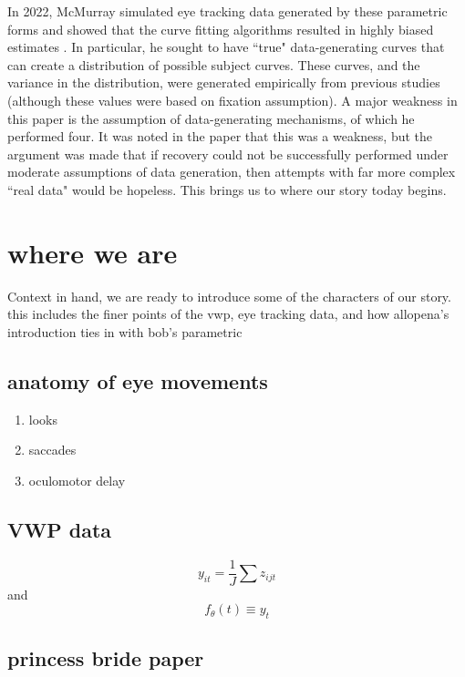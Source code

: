 \documentclass{article}
\begin{document}
In 2022, McMurray simulated eye tracking data generated by these parametric forms and showed that the curve fitting algorithms resulted in highly biased estimates \cite{mcmurray2022m}. In particular, he sought to have ``true" data-generating curves that can create a distribution of possible subject curves. These curves, and the variance in the distribution, were generated empirically from previous studies (although these values were based on fixation assumption). A major weakness in this paper is the assumption of data-generating mechanisms, of which he performed four. It was noted in the paper that this was a weakness, but the argument was made that if recovery could not be successfully performed under moderate assumptions of data generation, then attempts with far more complex ``real data" would be hopeless. This brings us to where our story today begins.

\section{where we are}

Context in hand, we are ready to introduce some of the characters of our story. this includes the finer points of the vwp, eye tracking data, and how allopena's introduction ties in with bob's parametric

\subsection{anatomy of eye  movements}

\begin{enumerate}
\item looks
\item saccades
\item oculomotor delay
\end{enumerate}

\subsection{VWP data}

\begin{equation}
y_{it} = \frac1J \sum z_{ijt}
\end{equation}
and
\begin{equation}
f_{\theta}(t) \equiv y_t
\end{equation}

\subsection{princess bride paper}
\end{document}

